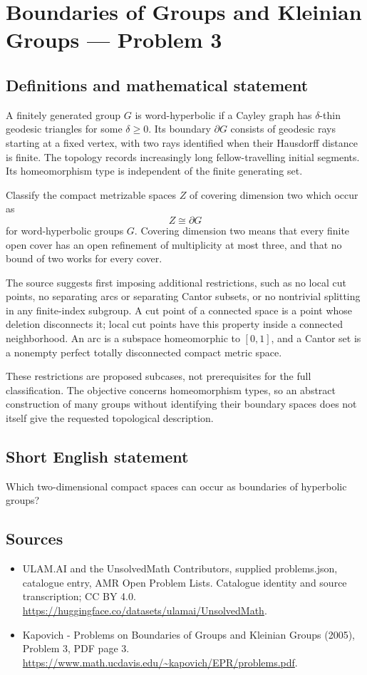 \documentclass[11pt,a4paper]{article}
\begin{document}
\section*{Boundaries of Groups and Kleinian Groups — Problem 3}\label{statement}

\subsection{Definitions and mathematical statement}
A finitely generated group $G$ is word-hyperbolic if a Cayley graph has $\delta$-thin geodesic triangles for some $\delta\geq0$. Its boundary $\partial G$ consists of geodesic rays starting at a fixed vertex, with two rays identified when their Hausdorff distance is finite. The topology records increasingly long fellow-travelling initial segments. Its homeomorphism type is independent of the finite generating set.

Classify the compact metrizable spaces $Z$ of covering dimension two which occur as
\[
 Z\cong\partial G
\]
for word-hyperbolic groups $G$. Covering dimension two means that every finite open cover has an open refinement of multiplicity at most three, and that no bound of two works for every cover.

The source suggests first imposing additional restrictions, such as no local cut points, no separating arcs or separating Cantor subsets, or no nontrivial splitting in any finite-index subgroup. A cut point of a connected space is a point whose deletion disconnects it; local cut points have this property inside a connected neighborhood. An arc is a subspace homeomorphic to $[0,1]$, and a Cantor set is a nonempty perfect totally disconnected compact metric space.

These restrictions are proposed subcases, not prerequisites for the full classification. The objective concerns homeomorphism types, so an abstract construction of many groups without identifying their boundary spaces does not itself give the requested topological description.
\subsection{Short English statement}
Which two-dimensional compact spaces can occur as boundaries of hyperbolic groups?
\subsection{Sources}
\begin{itemize}
\item[S1] ULAM.AI and the UnsolvedMath Contributors, supplied problems.json, catalogue entry, AMR Open Problem Lists. Catalogue identity and source transcription; CC BY 4.0.
\url{https://huggingface.co/datasets/ulamai/UnsolvedMath}.
\item[S2] Kapovich - Problems on Boundaries of Groups and Kleinian Groups (2005), Problem 3, PDF page 3. 
\url{https://www.math.ucdavis.edu/~kapovich/EPR/problems.pdf}.
\end{itemize}
\end{document}
